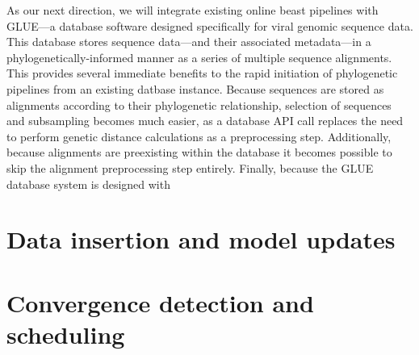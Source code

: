 As our next direction, we will integrate existing online \gls{beast} pipelines with GLUE\cite{glue}---a database software designed specifically for viral genomic sequence data.
This database stores sequence data---and their associated metadata---in a phylogenetically-informed manner as a series of multiple sequence alignments.
This provides several immediate benefits to the rapid initiation of phylogenetic pipelines from an existing datbase instance.
Because sequences are stored as alignments according to their phylogenetic relationship, selection of sequences and subsampling becomes much easier, as a database API call replaces the need to perform genetic distance calculations as a preprocessing step.
Additionally, because alignments are preexisting within the database it becomes possible to skip the alignment preprocessing step entirely.
Finally, because the GLUE database system is designed with


\section{Data insertion and model updates}

\section{Convergence detection and scheduling}








\cleardoublepage

